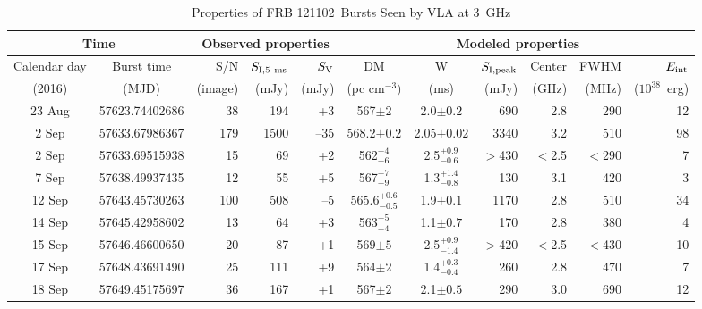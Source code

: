 \documentclass[twocolumn]{aastex61}
\newcommand{\frb}{FRB 121102}
\begin{document}
\begin{table}
\caption{Properties of \frb\ Bursts Seen by VLA at 3~GHz}
\begin{tabular}{cc|rrr|ccrrrr}
\multicolumn{2}{c|}{Time} & \multicolumn{3}{c|}{Observed properties} & \multicolumn{6}{c}{Modeled properties} \\ \hline
Calendar day & Burst time   & S/N & $S_{\rm{I, 5~ms}}$	& $S_{\rm{V}}$ 	& DM 			& W 			& $S_{\rm{I,peak}}$ & Center & FWHM & $E_{\rm{int}}$ \\
(2016)       &  (MJD)     &   (image)    & (mJy) 			& (mJy) 		    & (pc cm$^{-3})$ 	& (ms) 			& (mJy) 			& (GHz)  & (MHz) & ($10^{38}$\ erg)\\ \hline
23 Aug & 57623.74402686      & 38 		& 194			& +3				& 567$\pm2$ 		& 2.0$\pm0.2$	 		& 690 		& 2.8 		& 290 & 12 	\\
2 Sep & 57633.67986367      & 179 		& 1500			& --35 				& 568.2$\pm0.2$ 	& 2.05$\pm0.02$			& 3340 		& 3.2 		& 510 & 98		\\
2 Sep\tablenotemark{c} & 57633.69515938 & 15 & 69		& +2				& 562$^{+4}_{-6}$ 	& 2.5$^{+0.9}_{-0.6}$	& $>$430 	& $<$2.5	& $<$290 & 7 	\\
7 Sep & 57638.49937435      & 12 		& 55			& +5 				& 567$^{+7}_{-9}$ 	& 1.3$^{+1.4}_{-0.8}$	& 130 		& 3.1 		& 420 & 3  	\\
12 Sep\tablenotemark{a} & 57643.45730263  & 100 		& 508 & --5 		& 565.6$^{+0.6}_{-0.5}$ & 1.9$\pm0.1$		& 1170 		& 2.8 		& 510 & 34 		\\
14 Sep\tablenotemark{a} & 57645.42958602   & 13 		& 64 & +3			& 563$^{+5}_{-4}$ 	& 1.1$\pm0.7$		 	& 170 		& 2.8 		& 380 & 4  	\\
15 Sep\tablenotemark{c} & 57646.46600650 & 20 & 87		& +1				& 569$\pm5$ 		& 2.5$^{+0.9}_{-1.4}$	& $>$420 	& $<$2.5 	& $<$430 & 10 	\\	
17 Sep\tablenotemark{a,b} & 57648.43691490 & 25 & 111	& +9				& 564$\pm2$ 		& 1.4$^{+0.3}_{-0.4}$	& 260 		& 2.8 		& 470 & 7  	\\
18 Sep\tablenotemark{a} & 57649.45175697   & 36 		& 167 & +1			& 567$\pm2$ 		& 2.1$\pm0.5$		 	& 290 		& 3.0 		& 690 & 12 	\\ \hline
\end{tabular}
\label{tab:spec}
\end{table} 
\end{document}
